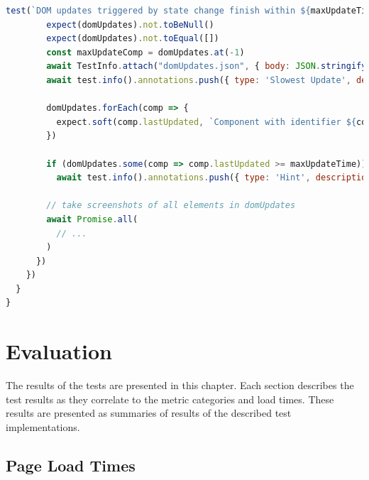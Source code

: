 \documentclass[a4paper, 12pt]{article}
\begin{document}
\begin{lstlisting}[caption={Test file for component update times}, label={lst:state-change-spec}, language=JavaScript, escapechar=°]
      test(`DOM updates triggered by state change finish within ${maxUpdateTime} ms`, { tag: ['@maximalReactionTime'] }, async ({ }, TestInfo) => {
        expect(domUpdates).not.toBeNull()
        expect(domUpdates).not.toEqual([])
        const maxUpdateComp = domUpdates.at(-1)
        await TestInfo.attach("domUpdates.json", { body: JSON.stringify(domUpdates, null, 2), contentType: "application/json" })
        await test.info().annotations.push({ type: 'Slowest Update', description: `Component with id ${maxUpdateComp.id} loaded ${maxUpdateComp.lastUpdated}ms after user input (xPath: ${maxUpdateComp.xpath})` });

        domUpdates.forEach(comp => {
          expect.soft(comp.lastUpdated, `Component with identifier ${comp.id} should finish updates within ${maxUpdateTime} ms`).toBeLessThanOrEqual(maxUpdateTime)
        })

        if (domUpdates.some(comp => comp.lastUpdated >= maxUpdateTime))
          await test.info().annotations.push({ type: 'Hint', description: `Screenshots below show slow updating components` });

        // take screenshots of all elements in domUpdates
        await Promise.all(
          // ...
        )
      })
    })
  }
}
\end{lstlisting}
\vspace{1cm}
  
\section{Evaluation}\label{sec:evaluation}

The results of the tests are presented in this chapter.
Each section describes the test results as they correlate to the metric categories and load times.
These results are presented as summaries of results of the described test implementations.

\subsection{Page Load Times}\label{subsec:pageloadtimes}
\end{document}
